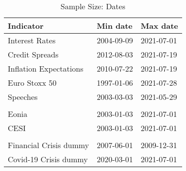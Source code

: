 \begin{table} [!ht]
\centering
\caption{Sample Size: Dates}
\label{tab:dates}
\begin{adjustbox}{width=0.5\textwidth}
\begin{tabular}[t]{lll}
\toprule
Indicator & Min date & Max date\\
\midrule
Interest Rates & 2004-09-09 & 2021-07-01\\
Credit Spreads & 2012-08-03 & 2021-07-19\\
Inflation Expectations & 2010-07-22 & 2021-07-19\\
Euro Stoxx 50 & 1997-01-06 & 2021-07-28\\
Speeches & 2003-03-03 & 2021-05-29\\
\addlinespace
 &  & \\
Eonia & 2003-01-03 & 2021-07-01\\
CESI & 2003-01-03 & 2021-07-01\\
 &  & \\
Financial Crisis dummy & 2007-06-01 & 2009-12-31\\
\addlinespace
Covid-19 Crisis dummy & 2020-03-01 & 2021-07-01\\
\bottomrule
\end{tabular}
\end{adjustbox}
\end{table}
